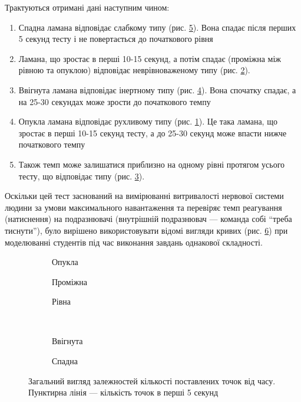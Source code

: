 Трактуються отримані дані наступним чином:
\begin{enumerate}
  \item Спадна ламана відповідає слабкому типу (рис. \ref{fig:tapping:weak}).
    Вона спадає після перших 5 секунд тесту і не повертається до початкового
    рівня
  \item Ламана, що зростає в перші 10-15 секунд, а потім спадає
    (проміжна між рівною та опуклою) відповідає неврівноваженому типу
    (рис. \ref{fig:tapping:middle}).
  \item Ввігнута ламана відповідає інертному типу
    (рис. \ref{fig:tapping:concave}).
    Вона спочатку спадає, а на 25-30 секундах може зрости до початкового темпу
  \item Опукла ламана відповідає рухливому типу
    (рис. \ref{fig:tapping:movable}).
    Це така ламана, що зростає в перші 10-15 секунд тесту, а до 25-30 секунд
    може впасти нижче початкового темпу
  \item Також темп може залишатися приблизно на одному рівні протягом
    усього тесту, що відповідає типу (рис. \ref{fig:tapping:flat}).
\end{enumerate}

Оскільки цей тест заснований на вимірюванні витривалості нервової системи людини
за умови максимального навантаження та перевіряє темп реагування (натиснення) на
подразнювачі (внутрішній подразнювач --- команда собі ``треба тиснути''),
було вирішено використовувати відомі вигляди кривих
(рис. \ref{fig:tikz:studentBehaviorSimple}) при моделюванні студентів
під час виконання завдань однакової складності.

\begin{figure}[h]
  \centering
  \begin{subfigure}[b]{0.3\textwidth}
                \caption{Опукла}
                \label{fig:tapping:movable}
  \end{subfigure}
  \begin{subfigure}[b]{0.3\textwidth}
                \caption{Проміжна}
                \label{fig:tapping:middle}
  \end{subfigure}
  \begin{subfigure}[b]{0.3\textwidth}
                \caption{Рівна}
                \label{fig:tapping:flat}
  \end{subfigure}\\[2ex]
  \begin{subfigure}[b]{0.3\textwidth}
                \caption{Ввігнута}
                \label{fig:tapping:concave}
  \end{subfigure}
  \begin{subfigure}[b]{0.3\textwidth}
                \caption{Спадна}
                \label{fig:tapping:weak}
  \end{subfigure}
  \caption{Загальний вигляд залежностей кількості поставлених точок від часу.
  Пунктирна лінія --- кількість точок в перші 5 секунд}
  \label{fig:tikz:studentBehaviorSimple}
\end{figure}


